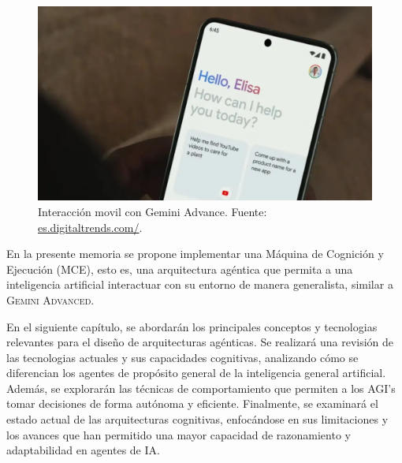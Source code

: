 \begin{figure}[!hbp]
	\centering
	\includegraphics[scale=0.2]{figs/gemini-phone.png}
	\caption{\small Interacción movil con Gemini Advance. Fuente: \href{https://es.digitaltrends.com/computadoras/cosas-increibles-que-puedes-hacer-con-google-gemini-advanced/}{es.digitaltrends.com/}.}
	\label{fig:etiqueta}
\end{figure}

En la presente memoria se propone implementar una Máquina de Cognición y
Ejecución (MCE), esto es, una arquitectura agéntica que permita a una
inteligencia artificial interactuar con su entorno de manera generalista,
similar a \textsc{Gemini Advanced}.

En el siguiente capítulo, se abordarán los principales conceptos y tecnologias
relevantes para el diseño de arquitecturas agénticas. Se realizará una revisión
de las tecnologias actuales y sus capacidades cognitivas, analizando cómo se
diferencian los agentes de propósito general de la inteligencia general
artificial. Además, se explorarán las técnicas de comportamiento que permiten a
los AGI's tomar decisiones de forma autónoma y eficiente. Finalmente, se
examinará el estado actual de las arquitecturas cognitivas, enfocándose en sus
limitaciones y los avances que han permitido una mayor capacidad de razonamiento
y adaptabilidad en agentes de IA.
